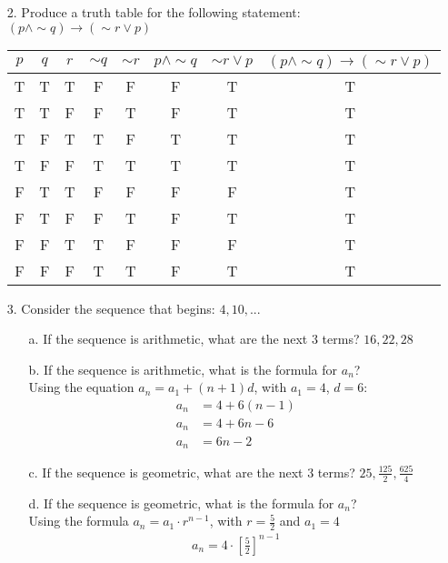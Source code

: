 \documentclass{article}
\begin{document}
\begin{itemize}
    \item[2.] Produce a truth table for the following statement: $(p\wedge\sim q)\to(\sim r\vee p)$
    \begin{center}
        \begin{tabular}{|c|c|c|c|c|c|c|c|}
            \hline
            $p$ & $q$ & $r$ & $\sim q$ & $\sim r$ & $p\wedge \sim q$ & $\sim r\vee p$ & $(p\wedge \sim q)\to(\sim r\vee p)$\\
            \hline
            T & T & T & F & F & F & T & T\\
            \hline
            T & T & F & F & T & F & T & T\\
            \hline
            T & F & T & T & F & T & T & T\\
            \hline
            T & F & F & T & T & T & T & T\\
            \hline
            F & T & T & F & F & F & F & T\\
            \hline
            F & T & F & F & T & F & T & T\\
            \hline
            F & F & T & T & F & F & F & T\\
            \hline
            F & F & F & T & T & F & T & T\\
            \hline
        \end{tabular}
    \end{center}
    
    \item[3.] Consider the sequence that begins: $4, 10, ...$
    \begin{itemize}
        \item[a.] If the sequence is arithmetic, what are the next 3 terms? {\color{blue}$16, 22, 28$}
        \newpage
        \item[b.] If the sequence is arithmetic, what is the formula for $a_n$?\\ {\color{blue}Using the equation $a_n=a_1+(n+1)d$, with $a_1=4$, $d=6$:
        \begin{align}
            a_n&=4+6(n-1)\nonumber\\
            a_n&=4+6n-6\nonumber\\
            a_n&=6n-2\nonumber
        \end{align}}

        \item[c.] If the sequence is geometric, what are the next 3 terms? {\color{blue}$25, \frac{125}{2}, \frac{625}{4}$}
        \item[d.] If the sequence is geometric, what is the formula for $a_n$?\\
        {\color{blue}Using the formula $a_n=a_1\cdot r^{n-1}$, with $r=\frac{5}{2}$ and $a_1=4$
        \begin{align}
            a_n=4\cdot\left[ \frac{5}{2} \right]^{n-1}\nonumber
        \end{align}}
    \end{itemize}
    

\end{itemize}
\end{document}
